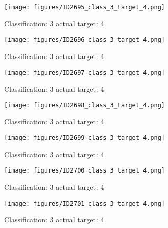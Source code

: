 \begin{figure}[h!]
\begin{center}
\texttt{[image: figures/ID2695\_class\_3\_target\_4.png]}
\end{center}
\caption{ Classification: 3 actual target: 4}
\label{fig:ID2695_class_3_target_4}
\end{figure}
\begin{figure}[h!]
\begin{center}
\texttt{[image: figures/ID2696\_class\_3\_target\_4.png]}
\end{center}
\caption{ Classification: 3 actual target: 4}
\label{fig:ID2696_class_3_target_4}
\end{figure}
\begin{figure}[h!]
\begin{center}
\texttt{[image: figures/ID2697\_class\_3\_target\_4.png]}
\end{center}
\caption{ Classification: 3 actual target: 4}
\label{fig:ID2697_class_3_target_4}
\end{figure}
\begin{figure}[h!]
\begin{center}
\texttt{[image: figures/ID2698\_class\_3\_target\_4.png]}
\end{center}
\caption{ Classification: 3 actual target: 4}
\label{fig:ID2698_class_3_target_4}
\end{figure}
\begin{figure}[h!]
\begin{center}
\texttt{[image: figures/ID2699\_class\_3\_target\_4.png]}
\end{center}
\caption{ Classification: 3 actual target: 4}
\label{fig:ID2699_class_3_target_4}
\end{figure}
\begin{figure}[h!]
\begin{center}
\texttt{[image: figures/ID2700\_class\_3\_target\_4.png]}
\end{center}
\caption{ Classification: 3 actual target: 4}
\label{fig:ID2700_class_3_target_4}
\end{figure}
\begin{figure}[h!]
\begin{center}
\texttt{[image: figures/ID2701\_class\_3\_target\_4.png]}
\end{center}
\caption{ Classification: 3 actual target: 4}
\label{fig:ID2701_class_3_target_4}
\end{figure}
